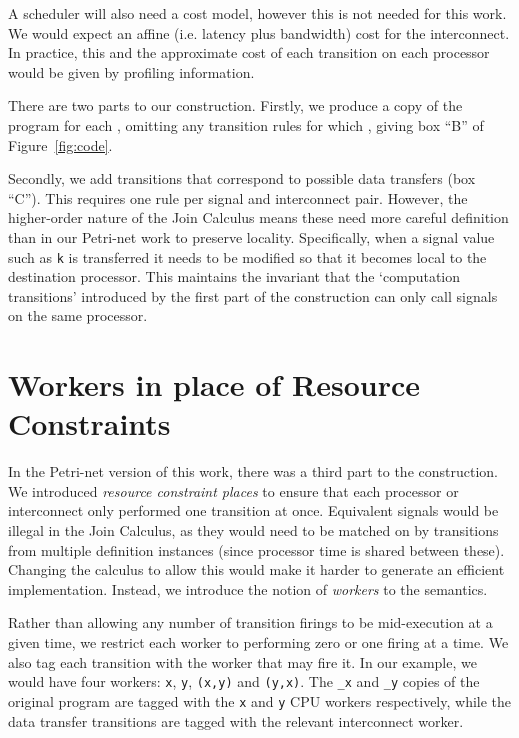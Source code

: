 \documentclass{eptcs}
\begin{document}
A scheduler will also need a cost model, however this is not needed for this
work. We would expect an affine (i.e. latency plus bandwidth) cost for the
interconnect.
In practice, this and the approximate cost of each transition on each processor would be given by profiling information.

There are two parts to our construction. Firstly, we produce a copy of the
program for each , omitting any transition rules  for which , giving box ``B'' of Figure~\ref{fig:code}.

Secondly, we add transitions that correspond to possible data transfers (box ``C'').
This requires one rule per signal and interconnect pair. However, the higher-order
nature of the Join Calculus means these need more careful definition than in our
Petri-net work to preserve locality. Specifically, when a signal value such as
\texttt{k} is transferred it needs to be modified so that it becomes local to
the destination processor. This maintains the invariant that the
`computation transitions' introduced by the first part of the construction can
only call signals on the same processor.

\section{Workers in place of Resource Constraints}\label{sec:workers}
In the Petri-net version of this work, there was a third part to the
construction. We introduced {\em resource constraint places} to ensure that
each processor or interconnect only performed one transition at once.
Equivalent signals would be illegal in the Join Calculus, as they would need to
be matched on by transitions from multiple definition instances (since processor
time is shared between these). Changing the calculus to allow this would make it
harder to generate an efficient implementation. Instead, we introduce the
notion of {\em workers} to the semantics.

Rather than allowing any number of transition firings to be mid-execution at
a given time, we restrict each worker to performing zero or one firing at a
time. We also tag each transition with the worker that may fire it. In our
example, we would have four workers: \texttt{x}, \texttt{y}, \texttt{(x,y)} and
\texttt{(y,x)}. The \texttt{\_x} and \texttt{\_y} copies of the original program
are tagged with the \texttt{x} and \texttt{y} CPU workers respectively, while the data transfer
transitions are tagged with the relevant interconnect worker.
\end{document}
